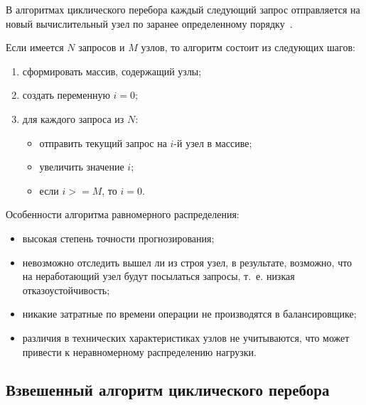 В алгоритмах циклического перебора каждый следующий запрос отправляется на новый вычислительный узел по заранее определенному порядку~\cite{comp}.

Если имеется $N$ запросов и $M$ узлов, то алгоритм состоит из следующих шагов:

\begin{enumerate}
	\item сформировать массив, содержащий узлы;
	\item создать переменную $i = 0$;
	\item для каждого запроса из $N$:
	\begin{itemize}
		\item отправить текущий запрос на $i$-й узел в массиве;
		\item увеличить значение $i$;
		\item если $i >= M$, то $i = 0$.
	\end{itemize}	
\end{enumerate}

Особенности алгоритма равномерного распределения:
\begin{itemize}
	\item высокая степень точности прогнозирования;
	\item невозможно отследить вышел ли из строя узел, в результате, возможно, что на неработающий узел будут посылаться запросы, т.~е. низкая отказоустойчивость;
	\item никакие затратные по времени операции не производятся в балансировщике;
	\item различия в технических характеристиках узлов не учитываются, что может привести к неравномерному распределению нагрузки.
\end{itemize}


\subsection*{Взвешенный алгоритм циклического перебора}

